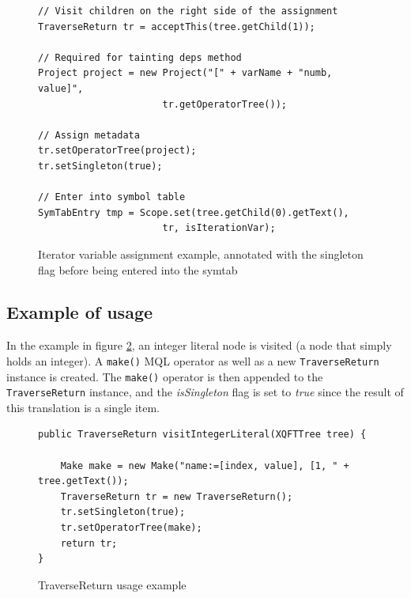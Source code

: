 \begin{figure}[!htp]
\begin{center}
\begin{Verbatim}
// Visit children on the right side of the assignment
TraverseReturn tr = acceptThis(tree.getChild(1));

// Required for tainting deps method
Project project = new Project("[" + varName + "numb, value]", 
                      tr.getOperatorTree());

// Assign metadata
tr.setOperatorTree(project);
tr.setSingleton(true);

// Enter into symbol table
SymTabEntry tmp = Scope.set(tree.getChild(0).getText(), 
                      tr, isIterationVar);
\end{Verbatim}
  \caption[Iterator variable annontion with singleton flag]{Iterator variable
  assignment example, annotated with the singleton flag before being entered into the symtab}
  \label{fig:impl:meta:var_assign_ex}
\end{center}
\end{figure}

\subsection{Example of usage}
In the example in figure \ref{fig:impl:meta:traverse_usage_ex}, an
integer literal node is visited (a node that simply holds an integer). A
\texttt{make()} MQL operator as well as a new \texttt{TraverseReturn}
instance is created. The \texttt{make()} operator is then appended to the 
\texttt{TraverseReturn} instance, and the \textit{isSingleton} flag is set to 
\textit{true} since the result of this translation is a single item.

\begin{figure}[!htp]
\begin{center}
\begin{Verbatim}
public TraverseReturn visitIntegerLiteral(XQFTTree tree) {

    Make make = new Make("name:=[index, value], [1, " + tree.getText());
    TraverseReturn tr = new TraverseReturn();        
    tr.setSingleton(true);
    tr.setOperatorTree(make);
    return tr;
}
\end{Verbatim}
  \caption{TraverseReturn usage example}
  \label{fig:impl:meta:traverse_usage_ex}
\end{center}
\end{figure}